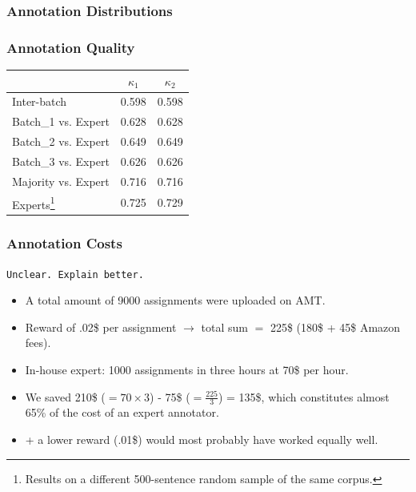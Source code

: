 \documentclass[10pt]{beamer}
\newenvironment{itemwide}%
{\begin{itemize}%
    \setlength{\itemsep}{5pt}%
    \setlength{\parskip}{5pt}}%
  {\end{itemize}}
\begin{document}
\begin{frame}
  \frametitle{Annotation Distributions}
  \begin{center}
  \end{center}
\end{frame}

\begin{frame}
  \frametitle{Annotation Quality}
\begin{center}
\begin{tabular}{|l|c|c|}
\hline
& $\kappa_{1}$ & $\kappa_{2}$ \\ 
\hline
Inter-batch & 0.598 & 0.598 \\ \hline
Batch\_1 vs. Expert & 0.628 & 0.628\\
Batch\_2 vs. Expert & 0.649 & 0.649\\
Batch\_3 vs. Expert & 0.626 & 0.626\\ \hline
Majority vs. Expert & 0.716 & 0.716\\ \hline
Experts\footnote{Results on a different 500-sentence random sample of the same corpus.} & 0.725 & 0.729\\ \hline
\end{tabular}
\end{center}
\end{frame}

\begin{frame}
  \frametitle{Annotation Costs}

\texttt{Unclear. Explain better.}

\begin{itemwide}
 \item A total amount of 9000 assignments were uploaded on AMT.
 \item Reward of .02\$ per assignment $\rightarrow$ total sum $=$ 225\$ (180\$ + 45\$ Amazon fees).
 \item In-house expert: 1000 assignments in three hours at 70\$ per hour.
 \item We saved 210\$ ($= 70 \times 3$) - 75\$ ($ = \frac{225}{3}$) = 135\$, which constitutes almost 65\% of the cost of an expert annotator.
 \item + a lower reward (.01\$) would most probably have worked equally well.
\end{itemwide}

\end{frame}
\end{document}

